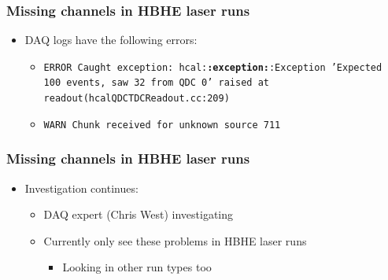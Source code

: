 \documentclass[bigger]{beamer}
\begin{document}
\begin{frame}
\frametitle{Missing channels in HBHE laser runs}
\label{sec-1-2-3}
\begin{itemize}

\item DAQ logs have the following errors:
\label{sec-1-2-3-1}%
\begin{itemize}

\item \texttt{ERROR Caught exception: hcal:\textbf{:exception:}:Exception 'Expected 100 events, saw 32 from QDC 0' raised at readout(hcalQDCTDCReadout.cc:209)}
\label{sec-1-2-3-1-1}%

\item \texttt{WARN Chunk received for unknown source 711}
\label{sec-1-2-3-1-2}%
\end{itemize} %
\end{itemize} %
\end{frame}
\begin{frame}
\frametitle{Missing channels in HBHE laser runs}
\label{sec-1-2-4}
\begin{itemize}

\item Investigation continues:
\label{sec-1-2-4-1}%
\begin{itemize}

\item DAQ expert (Chris West) investigating
\label{sec-1-2-4-1-1}%

\item Currently only see these problems in HBHE laser runs
\label{sec-1-2-4-1-2}%
\begin{itemize}

\item Looking in other run types too
\label{sec-1-2-4-1-2-1}%
\end{itemize} %
\end{itemize} %
\end{itemize} %
\end{frame}
\end{document}
